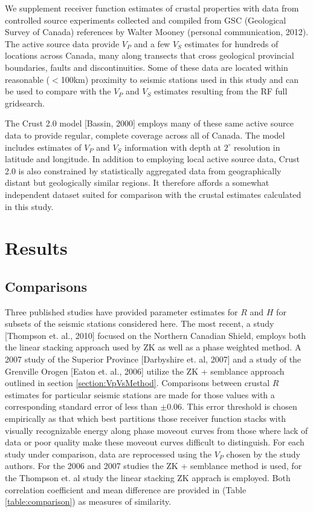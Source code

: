 \documentclass[draft, 12pt]{article}
\begin{document}
We supplement receiver function estimates of crustal properties with data from controlled source experiments collected and compiled from GSC (Geological Survey of Canada) references by Walter Mooney (personal communication, 2012). The active source data provide $V_P$ and a few $V_S$ estimates for hundreds of locations across Canada, many along transects that cross geological provincial boundaries, faults and discontinuities. Some of these data are located within reasonable ($<$100km) proximity to seismic stations used in this study and can be used to compare with the $V_P$ and $V_S$ estimates resulting from the RF full gridsearch.

The Crust 2.0 model [Bassin, 2000] employs many of these same active source data to provide regular, complete coverage across all of Canada. The model includes estimates of $V_P$ and $V_S$ information with depth at
$2^\circ$ resolution in latitude and longitude. In addition to employing local active source data, Crust 2.0 is also constrained by statistically aggregated data from geographically distant but geologically similar regions. It therefore affords a somewhat independent dataset suited for comparison with the crustal estimates calculated in this study.

\section{Results}

\subsection{Comparisons}

Three published studies have provided parameter estimates for $R$ and $H$ for subsets of the seismic stations considered here. The most recent, a study [Thompson et. al., 2010] focused on the Northern Canadian Shield, employs both the linear stacking approach used by ZK as well as a phase weighted method. A 2007 study of the Superior Province [Darbyshire et. al, 2007] and a study of the Grenville Orogen [Eaton et. al., 2006] utilize the ZK + semblance approach outlined in section \ref{section:VpVsMethod}.  Comparisons between crustal $R$ estimates for particular seismic stations are made for those values with a corresponding standard error of less than $\pm$0.06. This error threshold is chosen empirically as that which best partitions those receiver function stacks with visually recognizable energy along phase moveout curves from those where lack of data or poor quality make these moveout curves difficult to distinguish. For each study under comparison, data are reprocessed using the $V_P$ chosen by the study authors. For the 2006 and 2007 studies the ZK + semblance method is used, for the Thompson et. al study the linear stacking ZK apprach is employed. Both correlation coefficient and mean difference are provided in (Table \ref{table:comparison}) as measures of similarity.
\end{document}
